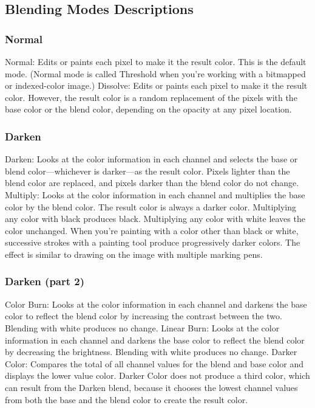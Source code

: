 \documentclass{beamer}
\begin{document}
\subsection{Blending Modes Descriptions}
\begin{frame}
	\frametitle{Normal}
	\begin{outline}
		\1 Normal:
		\2 Edits or paints each pixel to make it the result color. This is the default mode. (Normal mode is called Threshold when you’re working with a bitmapped or indexed-color image.)
		\1 Dissolve: 
		\2 Edits or paints each pixel to make it the result color. However, the result color is a random replacement of the pixels with the base color or the blend color, depending on the opacity at any pixel location.
	\end{outline}
\end{frame}

\begin{frame}
	\frametitle{Darken}
	\begin{outline}
		\1 Darken:
		\2 Looks at the color information in each channel and selects the base or blend color—whichever is darker—as the result color. Pixels lighter than the blend color are replaced, and pixels darker than the blend color do not change.
		\1 Multiply:  
		\2 Looks at the color information in each channel and multiplies the base color by the blend color. The result color is always a darker color. Multiplying any color with black produces black. Multiplying any color with white leaves the color unchanged. When you’re painting with a color other than black or white, successive strokes with a painting tool produce progressively darker colors. The effect is similar to drawing on the image with multiple marking pens.
	\end{outline}
\end{frame}

\begin{frame}
	\frametitle{Darken (part 2)}
	\begin{outline}
		\1 Color Burn:
		\2 Looks at the color information in each channel and darkens the base color to reflect the blend color by increasing the contrast between the two. Blending with white produces no change.
		\1 Linear Burn:
		\2 Looks at the color information in each channel and darkens the base color to reflect the blend color by decreasing the brightness. Blending with white produces no change.
		\1 Darker Color:  
		\2 Compares the total of all channel values for the blend and base color and displays the lower value color. Darker Color does not produce a third color, which can result from the Darken blend, because it chooses the lowest channel values from both the base and the blend color to create the result color.
	\end{outline}
\end{frame}
\end{document}
